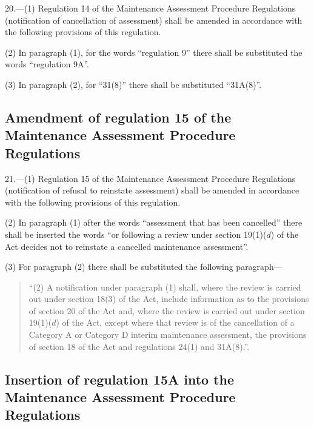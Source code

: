 \documentclass[a4paper]{article}
\begin{document}
20.—(1) Regulation 14 of the Maintenance Assessment Procedure Regulations (notification of cancellation of assessment) shall be amended in accordance with the following provisions of this regulation.

(2) In paragraph (1), for the words “regulation 9” there shall be substituted the words “regulation 9A”.

(3) In paragraph (2), for “31(8)” there shall be substituted “31A(8)”.

\subsection[21. Amendment of regulation 15 of the Maintenance Assessment Procedure Regulations]{Amendment of regulation 15 of the Maintenance Assessment Procedure Regulations}

21.—(1) Regulation 15 of the Maintenance Assessment Procedure Regulations (notification of refusal to reinstate assessment) shall be amended in accordance with the following provisions of this regulation.

(2) In paragraph (1) after the words “assessment that has been cancelled” there shall be inserted the words “or following a review under section 19(1)($d$) of the Act decides not to reinstate a cancelled maintenance assessment”.

(3) For paragraph (2) there shall be substituted the following paragraph—
\begin{quotation}
“(2) A notification under paragraph (1) shall, where the review is carried out under section 18(3) of the Act, include information as to the provisions of section 20 of the Act and, where the review is carried out under section 19(1)($d$) of the Act, except where that review is of the cancellation of a Category A or Category D interim maintenance assessment, the provisions of section 18 of the Act and regulations 24(1) and 31A(8).”.
\end{quotation}

\subsection[22. Insertion of regulation 15A into the Maintenance Assessment Procedure Regulations]{Insertion of regulation 15A into the Maintenance Assessment Procedure Regulations}
\end{document}
